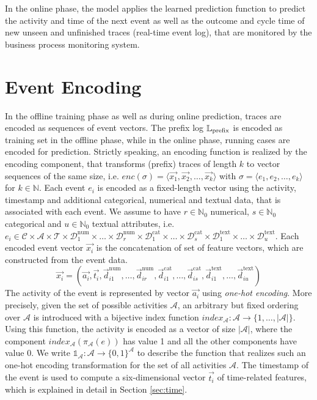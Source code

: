 In the online phase, the model applies the learned prediction function to predict the activity and time of the next event as well as the outcome and cycle time of new unseen and unfinished traces (real-time event log), that are monitored by the business process monitoring system.

\section{Event Encoding}\label{sec:event}

In the offline training phase as well as during online prediction, traces are encoded as sequences of event vectors.
The prefix log $\mathbb{L}_\mathrm{prefix}$ is encoded as training set in the offline phase, while in the online phase, running cases are encoded for prediction.
Strictly speaking, an encoding function is realized by the encoding component, that transforms (prefix) traces of length $k$ to vector sequences of the same size, i.e. $enc(\sigma) = \langle \vec{x_1}, \vec{x_2}, \dots, \vec{x_k}\rangle$ with $\sigma = \langle e_1, e_2, \dots, e_k\rangle$ for $k \in \mathbb{N}$.
Each event $e_i$ is encoded as a fixed-length vector using the activity, timestamp and additional categorical, numerical and textual data, that is associated with each event.
We assume to have $r \in \mathbb{N}_0$ numerical, $s \in \mathbb{N}_0$ categorical and $u \in \mathbb{N}_0$ textual attributes, i.e. $e_i \in \mathcal{C} \times \mathcal{A}  \times \mathcal{T} \times \mathcal{D}_1^\mathrm{num} \times \dots \times \mathcal{D}_r^\mathrm{num}   \times \mathcal{D}_1^\mathrm{cat}  \times  \dots  \times \mathcal{D}_s^\mathrm{cat}   \times \mathcal{D}_1^\mathrm{text}   \times \dots  \times \mathcal{D}_u^\mathrm{text}$.
Each encoded event vector $\vec{x_i}$ is the concatenation of set of feature vectors, which are constructed from the event data.
\begin{equation*}
\vec{x_i}=(
\vec{a_i},
\vec{t_i},
\vec{d}_{i1}^\mathrm{num}, \dots,\vec{d}_{ir}^\mathrm{num},
\vec{d}_{i1}^\mathrm{cat}, \dots,\vec{d}_{is}^\mathrm{cat},
\vec{d}_{i1}^\mathrm{text}, \dots, \vec{d}_{iu}^\mathrm{text})
\end{equation*}
The activity of the event is represented by vector $\vec{a_i}$ using \textit{one-hot encoding}.
More precisely, given the set of possible activities $\mathcal{A}$, an arbitrary but fixed ordering over $\mathcal{A}$ is introduced with a bijective index function $index_\mathcal{A} \colon \mathcal{A} \to \{1, \dots, |\mathcal{A}|\}$.
Using this function, the activity is encoded as a vector of size $|\mathcal{A}|$, where the component $index_\mathcal{A}(\pi_\mathcal{A}(e))$ has value 1 and all the other components have value 0.
We write $\mathds{1}_\mathcal{A}\colon \mathcal{A} \to \{0,1\}^\mathcal{A}$ to describe the function that realizes such an one-hot encoding transformation for the set of all activities $\mathcal{A}$.
The timestamp of the event is used to compute a six-dimensional vector $\vec{t_i}$ of time-related features, which is explained in detail in Section \ref*{sec:time}.

